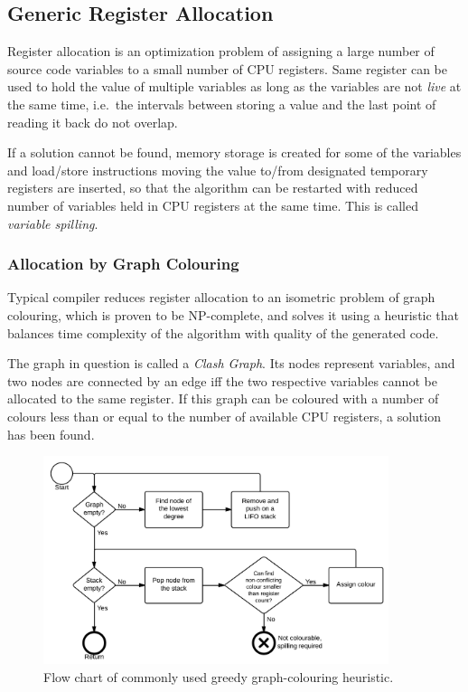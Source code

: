 \documentclass[12pt,twoside,notitlepage]{report}
\begin{document}
\subsection{Generic Register Allocation}

Register allocation is an optimization problem of assigning a large number of source code variables to a small number of CPU registers. Same register can be used to hold the value of multiple variables as long as the variables are not \emph{live} at the same time, i.e.\ the intervals between storing a value and the last point of reading it back do not overlap. 

If a solution cannot be found, memory storage is created for some of the variables and load/store instructions moving the value to/from designated temporary registers are inserted, so that the algorithm can be restarted with reduced number of variables held in CPU registers at the same time. This is called \emph{variable spilling}.

\subsubsection{Allocation by Graph Colouring}

Typical compiler reduces register allocation to an isometric problem of graph colouring, which is proven to be NP-complete, and solves it using a heuristic that balances time complexity of the algorithm with quality of the generated code. 

The graph in question is called a \emph{Clash Graph}. Its nodes represent variables, and two nodes are connected by an edge iff the two respective variables cannot be allocated to the same register. If this graph can be coloured with a number of colours less than or equal to the number of available CPU registers, a solution has been found. 

\begin{figure}
	\centerline{	
		\includegraphics[width=0.9\textwidth]{figs/fig_implementation_gc.png}
	}
	\caption{Flow chart of commonly used greedy graph-colouring heuristic.}
	\label{fig:Implementation_GraphColouring}
\end{figure}
\end{document}
